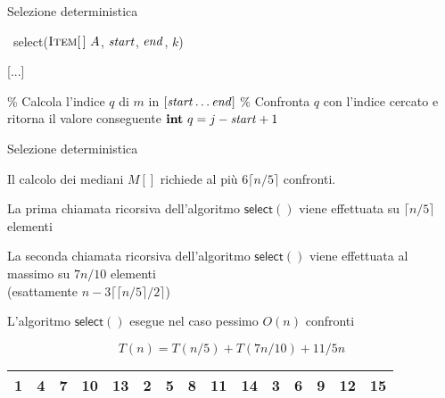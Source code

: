 \begin{frame}{Selezione deterministica}

\vspace{-12pt}
\small
\begin{Procedure}
\caption[A]{\Item\ \textsf{select}($\textsc{Item}[\,]\ A$, \INTEGER $\mathit{start}$, \INTEGER $\mathit{end}$, \INTEGER $k$)}
[...]\;

\BlankLine
\% Calcola l'indice $q$ di $m$ in $[\mathit{start} \ldots \mathit{end}]$\;
\% Confronta $q$ con l'indice cercato e ritorna il valore conseguente\;
$\INTEGER\ q = j-\Primo+1$\;
\end{Procedure}

\end{frame}


\begin{frame}{Selezione deterministica}

\vspace{-9pt}
\BIL
\item  Il calcolo dei mediani $M[]$ richiede al più $6 \lceil n/5 \rceil$  confronti.
\item La prima chiamata ricorsiva dell'algoritmo $\textsf{select}()$ viene effettuata su $\lceil n/5 \rceil$ elementi
\item La seconda chiamata ricorsiva dell'algoritmo $\textsf{select}()$ viene effettuata al massimo  su $7n/10$ elementi\\
 (esattamente $n - 3 \lceil  \lceil n/5 \rceil /2 \rceil$) 
\item L'algoritmo $\textsf{select}()$ esegue nel caso pessimo $O(n)$ confronti

\[
  T(n) = T(n/5) + T(7n/10) + 11/5n
\]
\EIL

\begin{center}
\begin{tabular}{|c|c|c|c|c||c|c|c|c|c||c|c|c|c|c|}
\hline
\alert{1} & \alert{4} & \alert{\textbf{7}} & 10 & 13 & \alert{2} & \alert{5} & \alert{\textbf{8}} & 11 & 14 & 3 & 6 & \textbf{9} & 12 & 15 \\\hline
\end{tabular}
\end{center}

\end{frame}

